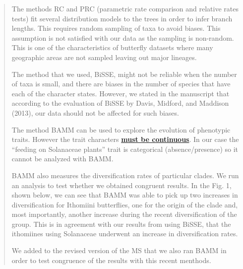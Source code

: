 \documentclass[]{article}
\begin{document}
\begin{quote}
\color{blue}
The methods RC and PRC (parametric rate comparison and relative rates tests) 
fit several distribution models to the trees in order to
infer branch lengths. This requires random sampling of taxa to avoid biases.
This assumption is not satisfied with our data as the sampling is non-random.
This is one of the characteristics of butterfly datasets where many geographic
areas are not sampled leaving out major lineages.

The method that we used, BiSSE, might not be reliable when the number of
taxa is small, and there are biases in the number of species that have
each of the character states. However, we stated in the manuscript that
according to the evaluation of BiSSE by Davis, Midford, and Maddison
(2013), our data should not be affected for such biases.

The method BAMM can be used to explore the evolution of phenotypic
traits. However the trait characters
\href{http://bamm-project.org/configuration.html\#id5}{\textbf{must be
continuous}}. In our case the ``feeding on Solanaceae plants'' trait is
categorical (absence/presence) so it cannot be analyzed with BAMM.

BAMM also measures the diversification rates of particular clades. We
run an analysis to test whether we obtained congruent results. In the
Fig. 1, shown below, we can see that BAMM was able to pick up two
increases in diversification for Ithomiini butterflies, one for the
origin of the clade and, most importantly, another increase during the
recent diversification of the group. This is in agreement with our
results from using BiSSE, that the ithomiines using Solanaceae underwent
an increase in diversification rates.

We added to the revised version of the MS that we also ran BAMM in order to
test congruence of the results with this recent menthods.
\end{quote}
\end{document}
